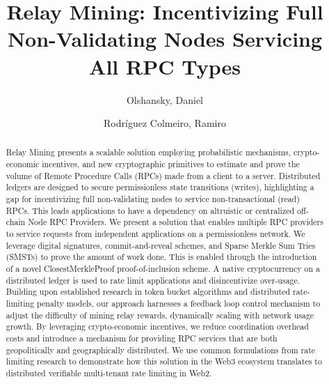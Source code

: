 \documentclass[runningheads]{llncs}
\begin{document}
\title{Relay Mining: Incentivizing Full Non-Validating Nodes Servicing All RPC Types}

\author{Olshansky, Daniel%
\and  Rodr\'iguez Colmeiro, Ramiro%
}


\maketitle %

\begin{abstract}

Relay Mining presents a scalable solution employing probabilistic mechanisms, crypto-economic incentives, and new cryptographic primitives to estimate and prove the volume of Remote Procedure Calls (RPCs) made from a client to a server. Distributed ledgers are designed to secure permissionless state transitions (writes), highlighting a gap for incentivizing full non-validating nodes to service non-transactional (read) RPCs. This leads applications to have a dependency on altruistic or centralized off-chain Node RPC Providers. We present a solution that enables multiple RPC providers to service requests from independent applications on a permissionless network. We leverage digital signatures, commit-and-reveal schemes, and Sparse Merkle Sum Tries (SMSTs) to prove the amount of work done. This is enabled through the introduction of a novel ClosestMerkleProof proof-of-inclusion scheme. A native cryptocurrency on a distributed ledger is used to rate limit applications and disincentivize over-usage. Building upon established research in token bucket algorithms and distributed rate-limiting penalty models, our approach harnesses a feedback loop control mechanism to adjust the difficulty of mining relay rewards, dynamically scaling with network usage growth. By leveraging crypto-economic incentives, we reduce coordination overhead costs and introduce a mechanism for providing RPC services that are both geopolitically and geographically distributed. We use common formulations from rate limiting research to demonstrate how this solution in the Web3 ecosystem translates to distributed verifiable multi-tenant rate limiting in Web2.



\end{abstract}
\end{document}

